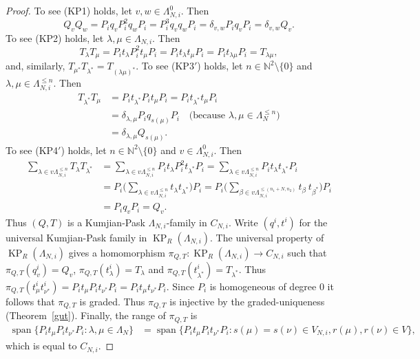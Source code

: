 \documentclass[a4paper,12pt]{amsart}
\numberwithin{equation}{section}
\theoremstyle{definition}
\theoremstyle{remark}
\begin{document}
\begin{proof}
To see  (KP1) holds, let $v,w\in \Lambda_{N,i}^0$. Then 
\[
Q_vQ_w=P_iq_vP_i^2q_wP_i=P_i^3q_vq_wP_i=\delta_{v,w}P_iq_vP_i=\delta_{v,w}Q_v.
\]
To see  (KP2) holds, let $\lambda,\mu\in\Lambda_{N,i}$.  Then
\[
T_\lambda T_\mu=P_it_\lambda P_i^2 t_\mu P_i=P_it_\lambda t_\mu P_i=P_i t_{\lambda\mu}P_i=T_{\lambda\mu},
\]
and, similarly, $T_{\mu^*} T_{\lambda^*}=T_{(\lambda\mu)^*}$.
To see (KP3$'$) holds, let $n\in{\mathbb{N}}^2\setminus\{0\}$ and $\lambda,\mu\in\Lambda_{N,i}^{\leq n}$. Then
\begin{align*}
T_{\lambda^*}T_\mu&=P_i t_{\lambda^*}P_it_\mu P_i=P_i t_{\lambda^*}t_\mu P_i\\
&=\delta_{\lambda,\mu}P_i q_{s(\mu)} P_i \quad\text{(because $\lambda,\mu\in\Lambda_N^{\leq n}$)}\\
&=\delta_{\lambda,\mu}Q_{s(\mu)}.
\end{align*}
To see (KP4$'$) holds, let $n\in{\mathbb{N}}^2\setminus\{0\}$ and $v\in\Lambda_{N,i}^0$. Then
\begin{align*}
\sum_{\lambda\in v\Lambda_{N,i}^{\leq n}} T_\lambda T_{\lambda^*}
&=\sum_{\lambda\in v\Lambda_{N,i}^{\leq n}} P_it_\lambda P_i^2 t_{\lambda^*}P_i=\sum_{\lambda\in v\Lambda_{N,i}^{\leq n}} P_it_\lambda  t_{\lambda^*}P_i\\
&=P_i\Big( \sum_{\lambda\in v\Lambda_{N,i}^{\leq n}} t_\lambda  t_{\lambda^*} \Big)P_i
=P_i\Big( \sum_{\beta\in v\Lambda_{N,i}^{\leq (n_1+N, n_2)}} t_\beta\ t_{\beta^*} \Big)P_i\\
&=P_iq_vP_i=Q_v.
\end{align*}
Thus $(Q,T)$ is a Kumjian-Pask $\Lambda_{N,i}$-family in $C_{N,i}$. Write $(q^i, t^i)$ for the universal Kumjian-Pask family in $\operatorname{KP}_R(\Lambda_{N,i})$. The  universal property of $\operatorname{KP}_R(\Lambda_{N,i})$ gives a homomorphism $\pi_{Q,T}: \operatorname{KP}_R(\Lambda_{N,i})\to C_{N,i}$ such that $\pi_{Q,T}(q_v^i)=Q_v$, $\pi_{Q,T}(t_\lambda^i)=T_\lambda$ and $\pi_{Q,T}(t_{\lambda^*}^i)=T_{\lambda^*}$. Thus $\pi_{Q,T}(t_\mu^i t_{\nu^*}^i)=P_it_\mu P_i t_{\nu^*}P_i=P_it_\mu t_{\nu^*}P_i$. Since $P_i$ is homogeneous of degree $0$ it follows that $\pi_{Q,T}$ is graded.  Thus $\pi_{Q,T}$ is injective by the graded-uniqueness (Theorem~\ref{gut}). Finally, the range of $\pi_{Q,T}$ is 
\begin{align*}{\operatorname{\mathrm{span}}}\{P_i t_\mu P_i t_{\nu^*}P_i:\lambda,\mu\in \Lambda_N\}&={\operatorname{\mathrm{span}}}\{P_i t_\mu P_i t_{\nu^*}P_i: s(\mu)=s(\nu)\in V_{N,i}, r(\mu), r(\nu)\in V\}, \end{align*}
which is equal to $C_{N,i}$.
\end{proof}
\end{document}

